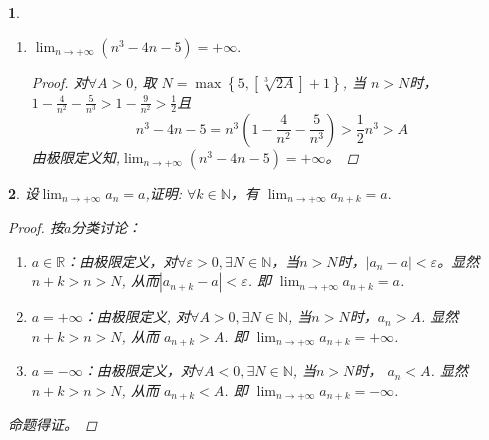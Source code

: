 \documentclass[utf8]{book}
\newtheorem{example}{}[section]             %
\begin{document}
\begin{example}
\begin{enumerate}
		\begin{proof}
         对$\forall \varepsilon > 0$, 取 $N = \left [ \frac{1}{\varepsilon}\right ] + 1$, 当 $n > N$时，
         \begin{equation*}
         \begin{aligned}
         \left | a_n - 1\right | &<
         \begin{cases}
         \displaystyle\frac{1}{n}, &\text{n 为偶数，}\\
         \displaystyle\frac{1}{\sqrt{n^2 + n} + n} , &\text{n 为奇数}
		\end{cases}\\
		&< \frac{1}{n} < \varepsilon
		\end{aligned}
		\end{equation*}
        由极限定义知,$\displaystyle\lim_{n\to +\infty}a_n = 1$.  
        \end{proof} 
        
        \item $\displaystyle \lim_{n\to +\infty}(n^3 - 4n - 5) = +\infty.$		
		\begin{proof}
         对$\forall A > 0$, 取 $N = \max\left\{5, \left [ \sqrt[3]{2A}\right ] + 1\right\}$, 当 $n > N$时，
         $1 - \frac{4}{n^2} - \frac{5}{n^3} > 1 - \frac{9}{n^2} > \frac{1}{2}$且 $$n^3 - 4n - 5 = n^3(1 - \frac{4}{n^2} - \frac{5}{n^3}) > \frac{1}{2}n^3 > A$$
        由极限定义知,$\displaystyle\lim_{n\to +\infty}(n^3 - 4n - 5) = +\infty$。  
        \end{proof}  
\end{enumerate}
\end{example}
\begin{example}
设$\displaystyle \lim_{n\to +\infty}a_n = a$,证明: $\forall k \in \mathbb{N}$，有 $\displaystyle \lim_{n\to +\infty}a_{n+k} = a.$
\begin{proof}按$a$分类讨论：
\renewcommand\labelenumi{\normalfont(\theenumi)}
\begin{enumerate}
\item $a\in \mathbb{R}$：由极限定义，对$\forall \varepsilon > 0, \exists N \in \mathbb{N}$，当$n > N$时，$\left|a_n - a\right| < \varepsilon$。显然 $n+k > n > N$, 从而$\left| a_{n + k} - a\right| < \varepsilon$. 即 $\displaystyle \lim_{n\to +\infty}a_{n+k} = a$.
\item $a = +\infty$：由极限定义, 对$\forall A > 0, \exists N \in \mathbb{N}$, 当$n > N$时，$a_n > A$. 显然 $n+k > n > N$, 从而 $a_{n + k} > A$. 即 $\displaystyle \lim_{n\to +\infty}a_{n+k} = +\infty$.
\item $a=-\infty$：由极限定义，对$\forall A < 0, \exists N \in \mathbb{N}$, 当$n > N$时， $a_n < A$. 显然 $n+k > n > N$, 从而 $a_{n + k} < A$. 即 $\displaystyle \lim_{n\to +\infty}a_{n+k} = -\infty$.
\end{enumerate}
命题得证。
\end{proof}
\end{example}
\end{document}

